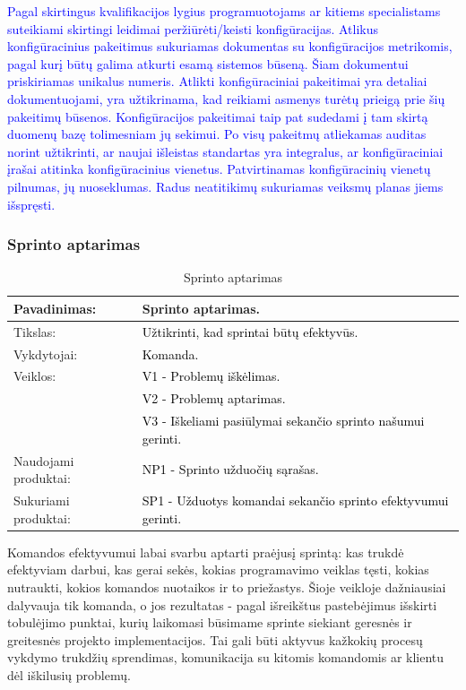\documentclass{VUMIFPSkursinis}
\begin{document}
		\textcolor{blue}{Pagal skirtingus kvalifikacijos lygius programuotojams ar kitiems specialistams suteikiami skirtingi leidimai peržiūrėti/keisti konfigūracijas. Atlikus konfigūracinius pakeitimus sukuriamas dokumentas su konfigūracijos metrikomis, pagal kurį būtų galima atkurti esamą sistemos būseną. Šiam dokumentui priskiriamas unikalus numeris.} \newline
		\textcolor{blue}{Atlikti konfigūraciniai pakeitimai yra detaliai dokumentuojami, yra užtikrinama, kad reikiami asmenys turėtų prieigą prie šių pakeitimų būsenos.} \newline
		\textcolor{blue}{Konfigūracijos pakeitimai taip pat sudedami į tam skirtą duomenų bazę tolimesniam jų sekimui.} \newline
		\textcolor{blue}{Po visų pakeitmų atliekamas auditas norint užtikrinti, ar naujai išleistas standartas yra integralus, ar konfigūraciniai įrašai atitinka konfigūracinius vienetus. Patvirtinamas konfigūracinių vienetų pilnumas, jų nuoseklumas. Radus neatitikimų sukuriamas veiksmų planas jiems išspręsti.}
	\subsubsection{Sprinto aptarimas}
	\begin{center}
		\begin{table}[ht]
			\caption{Sprinto aptarimas}
			\begin{tabular}{ | l | l | }
				\hline
				Pavadinimas:         & Sprinto aptarimas.							\\ \hline
				Tikslas:             & \textcolor{black}{Užtikrinti, kad sprintai būtų efektyvūs.}				\\ \hline
				Vykdytojai:          & \textcolor{black}{ Komanda.}								\\ \hline
				Veiklos:             & \textcolor{black}{ V1 - Problemų iškėlimas.}						\\
				                     & \textcolor{black}{V2 - Problemų aptarimas.}						\\
				                     & \textcolor{black}{V3 - Iškeliami pasiūlymai sekančio sprinto našumui gerinti.}		\\ \hline
				Naudojami produktai: & \textcolor{black}{NP1 - Sprinto užduočių sąrašas. 	}				\\ \hline
				Sukuriami produktai: & \textcolor{black}{SP1 - Užduotys komandai sekančio sprinto efektyvumui gerinti.}	\\ \hline
			\end{tabular}
		\end{table}
	\end{center}
	Komandos efektyvumui labai svarbu aptarti praėjusį sprintą: kas trukdė efektyviam darbui, kas gerai sekės, kokias programavimo veiklas tęsti, kokias nutraukti, kokios komandos nuotaikos ir to priežastys.
	Šioje veikloje dažniausiai dalyvauja tik komanda, o jos rezultatas - pagal išreikštus pastebėjimus išskirti tobulėjimo punktai, kurių laikomasi būsimame sprinte siekiant geresnės ir greitesnės projekto implementacijos.
	Tai gali būti aktyvus kažkokių procesų vykdymo trukdžių sprendimas, komunikacija su kitomis komandomis ar klientu dėl iškilusių problemų.
\end{document}
